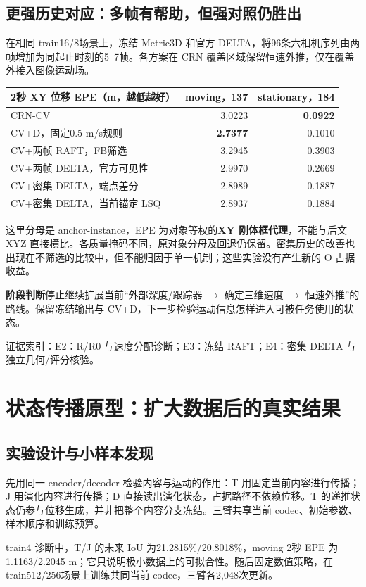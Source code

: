 \documentclass[UTF8,a4paper,11pt,fontset=none]{ctexart}
\newcommand{\evidence}[1]{{\footnotesize\color{muted}\par\noindent 证据索引：#1。\par}}
\newcommand{\takeaway}[1]{\par\noindent\colorbox{pale}{\parbox{\dimexpr\linewidth-2\fboxsep}{\vspace{3pt}\textbf{阶段判断}\quad #1\vspace{3pt}}}\par}
\begin{document}
\subsection{更强历史对应：多帧有帮助，但强对照仍胜出}
在相同 train16/8场景上，冻结 Metric3D 和官方 DELTA，将96条六相机序列由两帧增加为同起止时刻的5--7帧。各方案在 CRN 覆盖区域保留恒速外推，仅在覆盖外接入图像运动场。
\begin{center}\small
\begin{tabularx}{\linewidth}{Yrr}
\toprule
2秒 XY 位移 EPE（m，越低越好） & moving，137 & stationary，184\\
\midrule
CRN-CV & 3.0223 & \textbf{0.0922}\\
CV+D，固定0.5 m/s规则 & \textbf{2.7377} & 0.1010\\
CV+两帧 RAFT，FB筛选 & 3.2945 & 0.3903\\
CV+两帧 DELTA，官方可见性 & 2.9970 & 0.2669\\
CV+密集 DELTA，端点差分 & 2.8989 & 0.1887\\
CV+密集 DELTA，当前锚定 LSQ & 2.8937 & 0.1884\\
\bottomrule
\end{tabularx}\end{center}
这里分母是 anchor-instance，EPE 为对象等权的\textbf{XY 刚体框代理}，不能与后文 XYZ 直接横比。各质量掩码不同，原对象分母及回退仍保留。密集历史的改善也出现在不筛选的比较中，但不能归因于单一机制；这些实验没有产生新的 O 占据收益。
\takeaway{停止继续扩展当前“外部深度/跟踪器 $\rightarrow$ 确定三维速度 $\rightarrow$ 恒速外推”的路线。保留冻结输出与 CV+D，下一步检验运动信息怎样进入可被任务使用的状态。}
\evidence{E2：R/R0 与速度分配诊断；E3：冻结 RAFT；E4：密集 DELTA 与独立几何/评分核验}

\clearpage
\section{状态传播原型：扩大数据后的真实结果}
\subsection{实验设计与小样本发现}
先用同一 encoder/decoder 检验内容与运动的作用：T 用固定当前内容进行传播；J 用演化内容进行传播；D 直接读出演化状态，占据路径不依赖位移。T 的递推状态仍参与位移生成，并非把整个内容分支冻结。三臂共享当前 codec、初始参数、样本顺序和训练预算。

train4 诊断中，T/J 的未来 IoU 为21.2815\%/20.8018\%，moving 2秒 EPE 为1.1163/2.2045 m；它只说明极小数据上的可拟合性。随后固定数值策略，在 train512/256场景上训练共同当前 codec，三臂各2,048次更新。
\end{document}
